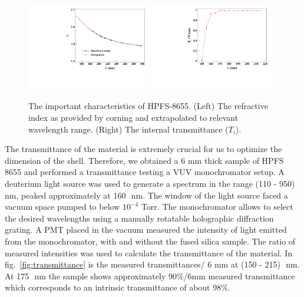 \begin{figure}
   \centering
   \includegraphics[width=0.48\textwidth]{RI-calibration.pdf}
    \includegraphics[width=0.48\textwidth]{IntTransmittance.pdf}
   \caption{The important characteristics of HPFS-8655. (Left) The refractive index as provided by corning and 
   extrapolated to relevant wavelength range. (Right) The internal transmittance ($T_{i}$).} 
   \label{fig:hpfsRIcalibration}
\end{figure}

The transmittance of the material is extremely crucial for us to optimize the dimension of the shell. Therefore, we obtained a 6 mm 
thick sample of HPFS 8655 and performed a transmittance testing a VUV monochromator setup. 
A deuterium light source was used to generate a spectrum in
the range (110 - 950)~\,nm, peaked approximately at 160~\,nm. The window of the light source faced a vacuum space pumped to below $10^{-4}$ Torr. 
The monochromator allows to select the desired wavelengths using a manually rotatable holographic diffraction grating. A PMT placed
in the vacuum measured the intensity of light emitted from the monochromator, with and without the fused silica sample. The ratio of 
measured intensities was used to calculate the transmittance of the material. In fig.~\ref{fig:transmittance} is the measured transmittances/ 6 mm at 
(150 - 215)~\,nm. At 175~\,nm the sample shows approximately 90\%/6mm measured transmittance which corresponds to an intrinsic transmittance of about 98\%.  



